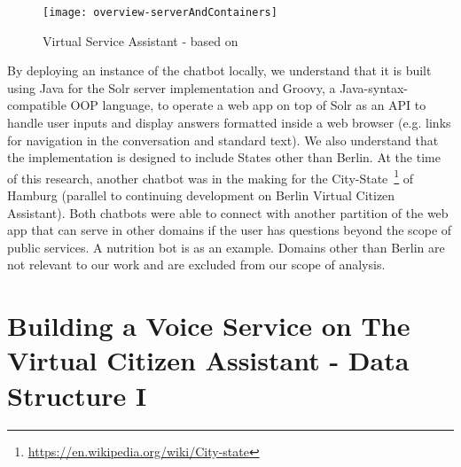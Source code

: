 %




\begin{wrapfigure}{l}{0.6\textwidth}
	\caption[Virtual Service Assistant Modules]{Virtual Service Assistant - based on \footnotemark }
	\label{vca:modules}
	\texttt{[image: overview-serverAndContainers]}
\end{wrapfigure}


By deploying an instance of the chatbot locally, we understand that it is built using Java for the Solr server implementation and Groovy, a Java-syntax-compatible OOP language, to operate a web app on top of Solr as an API to handle user inputs and display answers formatted inside a web browser (e.g. links for navigation in the conversation and standard text). We also understand that the implementation is designed to include States other than Berlin. At the time of this research, another chatbot was in the making for the City-State~\footnote{\url{https://en.wikipedia.org/wiki/City-state}} of Hamburg (parallel to continuing development on Berlin Virtual Citizen Assistant). Both chatbots were able to connect with another partition of the web app that can serve in other domains if the user has questions beyond the scope of public services. A nutrition bot is as an example. Domains other than Berlin are not relevant to our work and are excluded from our scope of analysis.





\section[Data Structure I]{Building a Voice Service on The Virtual Citizen Assistant -  Data Structure I}


